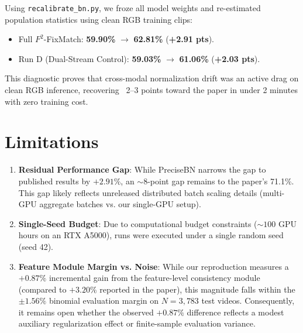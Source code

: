 \documentclass[10pt,twocolumn,a4paper]{article}
\begin{document}
Using \texttt{recalibrate\_bn.py}, we froze all model weights and re-estimated population statistics using clean RGB training clips:
\begin{itemize}
    \item Full $F^2$-FixMatch: \textbf{59.90\%} $\longrightarrow$ \textbf{62.81\%} (\textbf{+2.91 pts}).
    \item Run D (Dual-Stream Control): \textbf{59.03\%} $\longrightarrow$ \textbf{61.06\%} (\textbf{+2.03 pts}).
\end{itemize}
This diagnostic proves that cross-modal normalization drift was an active drag on clean RGB inference, recovering ~2--3 points toward the paper in under 2 minutes with zero training cost.

\section{Limitations}
\label{sec:limitations}
\begin{enumerate}
    \item \textbf{Residual Performance Gap}: While PreciseBN narrows the gap to published results by $+2.91\%$, an $\sim 8$-point gap remains to the paper's 71.1\%. This gap likely reflects unreleased distributed batch scaling details (multi-GPU aggregate batches vs. our single-GPU setup).
    \item \textbf{Single-Seed Budget}: Due to computational budget constraints ($\sim 100$ GPU hours on an RTX A5000), runs were executed under a single random seed (seed 42).
    \item \textbf{Feature Module Margin vs. Noise}: While our reproduction measures a $+0.87\%$ incremental gain from the feature-level consistency module (compared to $+3.20\%$ reported in the paper), this magnitude falls within the $\pm 1.56\%$ binomial evaluation margin on $N=3{,}783$ test videos. Consequently, it remains open whether the observed $+0.87\%$ difference reflects a modest auxiliary regularization effect or finite-sample evaluation variance.
\end{enumerate}

\end{document}
